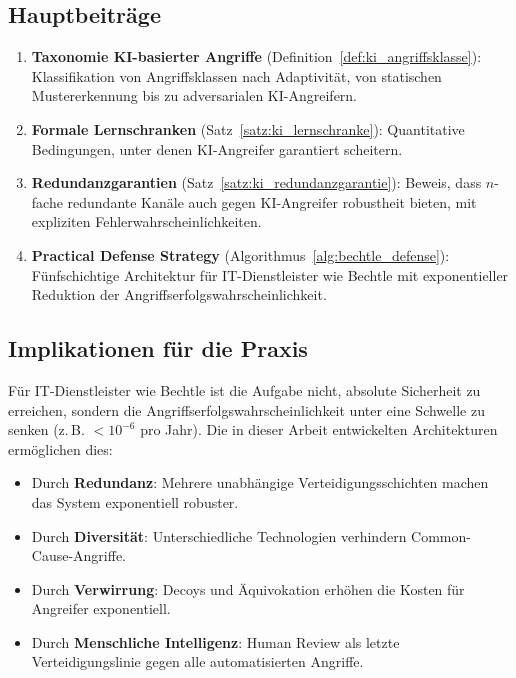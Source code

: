 \documentclass[a4paper,12pt]{article}
\theoremstyle{definition}
\begin{document}
\subsection{Hauptbeiträge}

\begin{enumerate}
	\item \textbf{Taxonomie KI-basierter Angriffe} (Definition~\ref{def:ki_angriffsklasse}): Klassifikation von Angriffsklassen nach Adaptivität, von statischen Mustererkennung bis zu adversarialen KI-Angreifern.
	
	\item \textbf{Formale Lernschranken} (Satz~\ref{satz:ki_lernschranke}): Quantitative Bedingungen, unter denen KI-Angreifer garantiert scheitern.
	
	\item \textbf{Redundanzgarantien} (Satz~\ref{satz:ki_redundanzgarantie}): Beweis, dass $n$-fache redundante Kanäle auch gegen KI-Angreifer robustheit bieten, mit expliziten Fehlerwahrscheinlichkeiten.
	
	\item \textbf{Practical Defense Strategy} (Algorithmus~\ref{alg:bechtle_defense}): Fünfschichtige Architektur für IT-Dienstleister wie Bechtle mit exponentieller Reduktion der Angriffserfolgswahrscheinlichkeit.
\end{enumerate}

\subsection{Implikationen für die Praxis}

Für IT-Dienstleister wie Bechtle ist die Aufgabe nicht, absolute Sicherheit zu erreichen, sondern die Angriffserfolgswahrscheinlichkeit unter eine Schwelle zu senken (z.\,B. $< 10^{-6}$ pro Jahr). Die in dieser Arbeit entwickelten Architekturen ermöglichen dies:

\begin{itemize}
	\item Durch \textbf{Redundanz}: Mehrere unabhängige Verteidigungsschichten machen das System exponentiell robuster.
	\item Durch \textbf{Diversität}: Unterschiedliche Technologien verhindern Common-Cause-Angriffe.
	\item Durch \textbf{Verwirrung}: Decoys und Äquivokation erhöhen die Kosten für Angreifer exponentiell.
	\item Durch \textbf{Menschliche Intelligenz}: Human Review als letzte Verteidigungslinie gegen alle automatisierten Angriffe.
\end{itemize}
\end{document}
